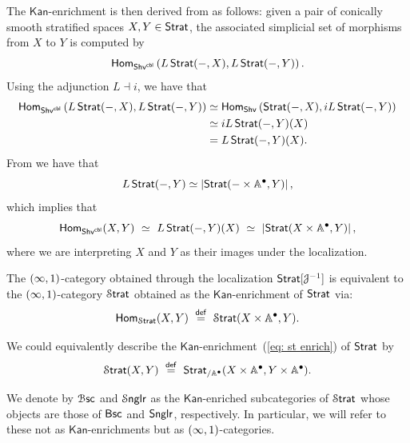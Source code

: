 The $\mathsf{Kan}$-enrichment is then derived from  as follows: given a pair of conically smooth stratified spaces $X,Y\in \strat$, the associated simplicial set of morphisms from $X$ to $Y$ is computed by 
\begin{equation}
    \Hom_{\shv^{\cbl}}\left(L\strat(-,X),L\strat(-,Y)\right).
\end{equation} 
Using the adjunction $L \dashv i$, we have that 
\begin{align}
    \Hom_{\shv^{\cbl}}\left(L\strat(-,X),L\strat(-,Y)\right) &\simeq \Hom_{\shv}\left(\strat(-,X),iL\strat(-,Y)\right) \\
    &\simeq iL\strat(-,Y)(X) \\
    &= L\strat(-,Y)(X).
\end{align}
From  we have that 
\begin{equation}
    L\strat(-,Y) \simeq \left|\strat(-\times \AA^\bullet,Y)\right|,
\end{equation}
which implies that 
\begin{equation}
    \Hom_{\shv^{\cbl}}(X,Y) \,\, \simeq \,\, L\strat(-,Y)(X) \,\, \simeq \,\, \left|\strat(X\times \AA^{\bullet},Y)\right|,
\end{equation} where we are interpreting $X$ and $Y$ as their images under the localization.

\begin{theorem}\cite[Theorem 2.4.5]{AFR1}\label{ch4:: thm: Strat enrichment}
    The $(\oo,1)$-category obtained through the localization $\strat[\cJ^{-1}]$ is equivalent to the $(\oo,1)$-category $\Strat$ obtained as the $\mathsf{Kan}$-enrichment of $\strat$ via:
    \begin{equation}\label{eq: st enrich}
        \Hom_{\Strat}(X,Y) \,\, \overset{\sf def}{=} \,\, \Strat(X\times \AA^{\bullet},Y).
    \end{equation}
\end{theorem}

\begin{observation}
    We could equivalently describe the $\mathsf{Kan}$-enrichment~(\ref{eq: st enrich}) of $\strat$ by 
\begin{equation}
    \Strat(X,Y) \,\, \overset{\sf def}{=}\,\, \strat_{/\AA^{\bullet}}(X\times \AA^{\bullet},Y\times \AA^{\bullet}).
\end{equation}
\end{observation}

\begin{notation}
    We denote by $\Bsc$ and $\Snglr$ as the $\mathsf{Kan}$-enriched subcategories of $\Strat$ whose objects are those of $\bsc$ and $\snglr$, respectively. In particular, we will refer to these not as $\mathsf{Kan}$-enrichments but as $(\oo,1)$-categories.
\end{notation}

